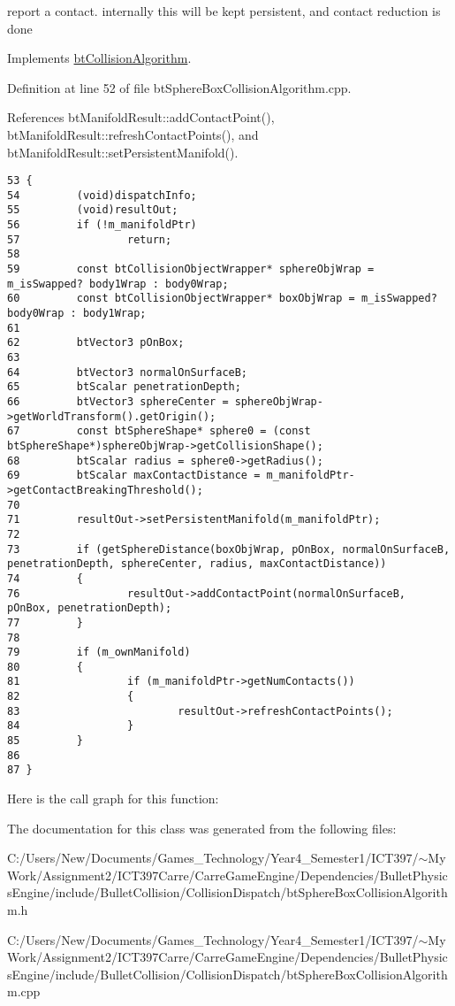 report a contact. internally this will be kept persistent, and contact reduction is done 

Implements \hyperlink{classbt_collision_algorithm}{btCollisionAlgorithm}.

Definition at line 52 of file btSphereBoxCollisionAlgorithm.cpp.

References btManifoldResult::addContactPoint(), btManifoldResult::refreshContactPoints(), and btManifoldResult::setPersistentManifold().

\begin{Code}\begin{verbatim}53 {
54         (void)dispatchInfo;
55         (void)resultOut;
56         if (!m_manifoldPtr)
57                 return;
58 
59         const btCollisionObjectWrapper* sphereObjWrap = m_isSwapped? body1Wrap : body0Wrap;
60         const btCollisionObjectWrapper* boxObjWrap = m_isSwapped? body0Wrap : body1Wrap;
61 
62         btVector3 pOnBox;
63 
64         btVector3 normalOnSurfaceB;
65         btScalar penetrationDepth;
66         btVector3 sphereCenter = sphereObjWrap->getWorldTransform().getOrigin();
67         const btSphereShape* sphere0 = (const btSphereShape*)sphereObjWrap->getCollisionShape();
68         btScalar radius = sphere0->getRadius();
69         btScalar maxContactDistance = m_manifoldPtr->getContactBreakingThreshold();
70 
71         resultOut->setPersistentManifold(m_manifoldPtr);
72 
73         if (getSphereDistance(boxObjWrap, pOnBox, normalOnSurfaceB, penetrationDepth, sphereCenter, radius, maxContactDistance))
74         {
76                 resultOut->addContactPoint(normalOnSurfaceB, pOnBox, penetrationDepth);
77         }
78 
79         if (m_ownManifold)
80         {
81                 if (m_manifoldPtr->getNumContacts())
82                 {
83                         resultOut->refreshContactPoints();
84                 }
85         }
86 
87 }
\end{verbatim}
\end{Code}




Here is the call graph for this function:

The documentation for this class was generated from the following files:\begin{CompactItemize}
\item 
C:/Users/New/Documents/Games\_\-Technology/Year4\_\-Semester1/ICT397/$\sim$My Work/Assignment2/ICT397Carre/CarreGameEngine/Dependencies/BulletPhysicsEngine/include/BulletCollision/CollisionDispatch/btSphereBoxCollisionAlgorithm.h\item 
C:/Users/New/Documents/Games\_\-Technology/Year4\_\-Semester1/ICT397/$\sim$My Work/Assignment2/ICT397Carre/CarreGameEngine/Dependencies/BulletPhysicsEngine/include/BulletCollision/CollisionDispatch/btSphereBoxCollisionAlgorithm.cpp\end{CompactItemize}
